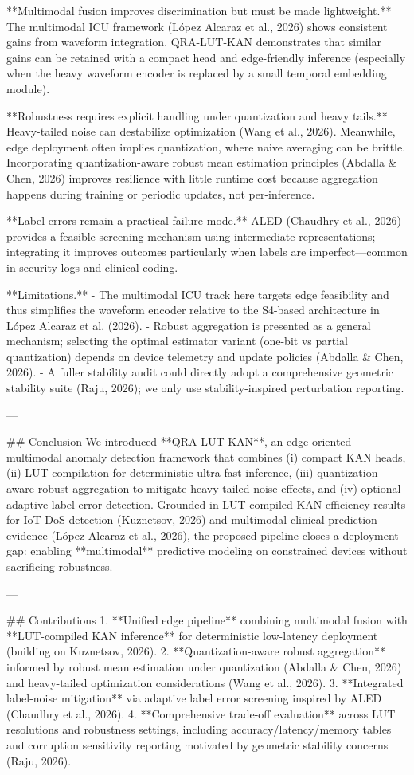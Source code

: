 **Multimodal fusion improves discrimination but must be made lightweight.** The multimodal ICU framework (López Alcaraz et al., 2026) shows consistent gains from waveform integration. QRA-LUT-KAN demonstrates that similar gains can be retained with a compact head and edge-friendly inference (especially when the heavy waveform encoder is replaced by a small temporal embedding module).

**Robustness requires explicit handling under quantization and heavy tails.** Heavy-tailed noise can destabilize optimization (Wang et al., 2026). Meanwhile, edge deployment often implies quantization, where naive averaging can be brittle. Incorporating quantization-aware robust mean estimation principles (Abdalla & Chen, 2026) improves resilience with little runtime cost because aggregation happens during training or periodic updates, not per-inference.

**Label errors remain a practical failure mode.** ALED (Chaudhry et al., 2026) provides a feasible screening mechanism using intermediate representations; integrating it improves outcomes particularly when labels are imperfect—common in security logs and clinical coding.

**Limitations.**  
- The multimodal ICU track here targets edge feasibility and thus simplifies the waveform encoder relative to the S4-based architecture in López Alcaraz et al. (2026).  
- Robust aggregation is presented as a general mechanism; selecting the optimal estimator variant (one-bit vs partial quantization) depends on device telemetry and update policies (Abdalla & Chen, 2026).  
- A fuller stability audit could directly adopt a comprehensive geometric stability suite (Raju, 2026); we only use stability-inspired perturbation reporting.

---

## Conclusion  
We introduced **QRA-LUT-KAN**, an edge-oriented multimodal anomaly detection framework that combines (i) compact KAN heads, (ii) LUT compilation for deterministic ultra-fast inference, (iii) quantization-aware robust aggregation to mitigate heavy-tailed noise effects, and (iv) optional adaptive label error detection. Grounded in LUT-compiled KAN efficiency results for IoT DoS detection (Kuznetsov, 2026) and multimodal clinical prediction evidence (López Alcaraz et al., 2026), the proposed pipeline closes a deployment gap: enabling **multimodal** predictive modeling on constrained devices without sacrificing robustness.

---

## Contributions  
1. **Unified edge pipeline** combining multimodal fusion with **LUT-compiled KAN inference** for deterministic low-latency deployment (building on Kuznetsov, 2026).  
2. **Quantization-aware robust aggregation** informed by robust mean estimation under quantization (Abdalla & Chen, 2026) and heavy-tailed optimization considerations (Wang et al., 2026).  
3. **Integrated label-noise mitigation** via adaptive label error screening inspired by ALED (Chaudhry et al., 2026).  
4. **Comprehensive trade-off evaluation** across LUT resolutions and robustness settings, including accuracy/latency/memory tables and corruption sensitivity reporting motivated by geometric stability concerns (Raju, 2026).